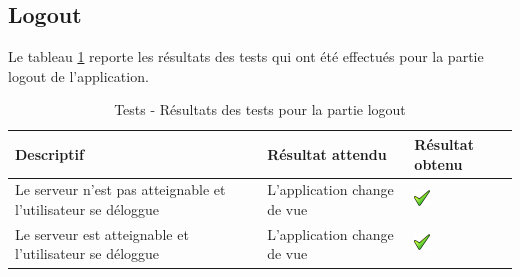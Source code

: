 \subsection{Logout} %
\label{sub:logout}
Le tableau \ref{tab:testLogout} reporte les résultats des tests qui ont été effectués pour la partie logout de l'application.
\begin{table}[H]
\begin{tabularx}{\textwidth}{|X|X|m{1.5cm}|}
  \hline
  \bf{Descriptif} & \bf{Résultat attendu} & \bf{Résultat obtenu} \\
  \hline
  Le serveur n'est pas atteignable et l'utilisateur se déloggue & L'application change de vue & \includegraphics[width=16px]{00_media/ok.png} \\
  \hline
  Le serveur est atteignable et l'utilisateur se déloggue  & L'application change de vue & \includegraphics[width=16px]{00_media/ok.png} \\
  \hline
\end{tabularx}
\caption{Tests - Résultats des tests pour la partie logout}
\label{tab:testLogout}
\end{table}

